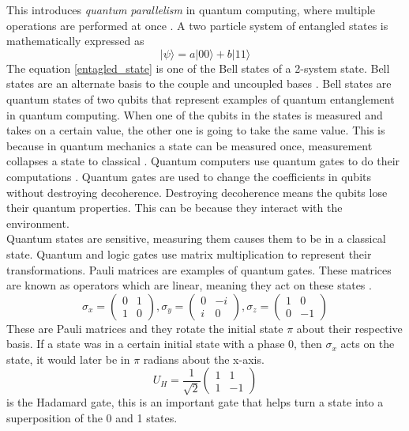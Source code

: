\documentclass{Assignment}
\begin{document}
This introduces \textit{quantum parallelism} in quantum computing, where multiple operations are performed at once \cite{mcintyre_quantum_2012}.
A two particle system of entangled states is mathematically expressed as
\begin{equation}
	|\psi \rangle = a|00\rangle + b|11\rangle
	\label{entagled_state}
\end{equation}
The equation \eqref{entagled_state} is one of the Bell states of a 2-system state.
Bell states are an alternate basis to the couple and uncoupled bases \cite{mcintyre_quantum_2012}.
Bell states are quantum states of two qubits that represent examples of quantum entanglement in quantum computing.
When one of the qubits in the states is measured and takes on a certain value, the other one is going to take the same value.
This is because in quantum mechanics a state can be measured once, measurement collapses a state to classical \cite{mcintyre_quantum_2012}.
Quantum computers use quantum gates to do their computations \cite{AndrewSteane}.
Quantum gates are used to change the coefficients in qubits without destroying decoherence.
Destroying decoherence means the qubits lose their quantum properties.
This can be because they interact with the environment.\\
Quantum states are sensitive, measuring them causes them to be in a classical state.
Quantum and logic gates use matrix multiplication to represent their transformations.
Pauli matrices are examples of quantum gates.
These matrices are known as operators which are linear, meaning they act on these states \cite{AndrewSteane,mcintyre_quantum_2012}.
\begin{equation}
	\sigma_x =\begin{pmatrix}
		0&1\\1&0
	\end{pmatrix},
	\sigma_y =\begin{pmatrix}
		0&-i\\i&0
	\end{pmatrix},\sigma_z =\begin{pmatrix}
		1&0\\0&-1
	\end{pmatrix}
\end{equation}
These are Pauli matrices and they rotate the initial state $\pi$ about their respective basis.
If a state was in a certain initial state with a phase 0, then $\sigma_x$ acts on the state, it would later be in $\pi$ radians about the x-axis.
\begin{equation}U_H=\frac{1}{\sqrt{2}}
	\begin{pmatrix}
		1&1\\1&-1
	\end{pmatrix}
\end{equation} is the Hadamard gate, this is an important gate that helps turn a state into a superposition of the 0 and 1 states.
\end{document}
